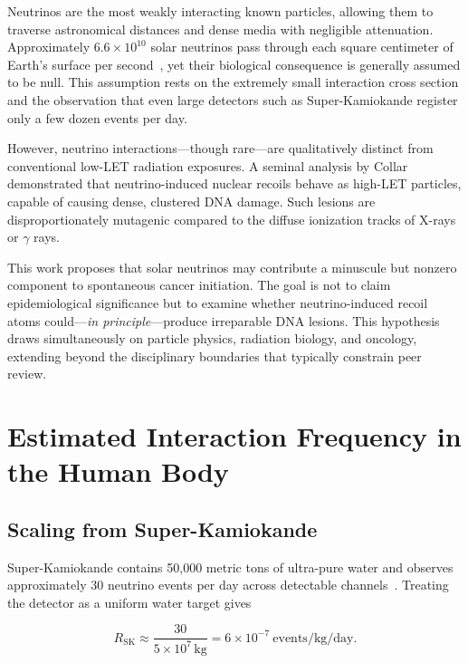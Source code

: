 \documentclass[12pt,a4paper]{article}
\begin{document}
Neutrinos are the most weakly interacting known particles, allowing them to traverse astronomical distances and dense media with negligible attenuation. Approximately $6.6\times10^{10}$ solar neutrinos pass through each square centimeter of Earth's surface per second~\cite{superk_physics}, yet their biological consequence is generally assumed to be null. This assumption rests on the extremely small interaction cross section and the observation that even large detectors such as Super-Kamiokande register only a few dozen events per day.

However, neutrino interactions---though rare---are qualitatively distinct from conventional low-LET radiation exposures. A seminal analysis by Collar~\cite{collar1996} demonstrated that neutrino-induced nuclear recoils behave as high-LET particles, capable of causing dense, clustered DNA damage. Such lesions are disproportionately mutagenic compared to the diffuse ionization tracks of X-rays or $\gamma$ rays.

This work proposes that solar neutrinos may contribute a minuscule but nonzero component to spontaneous cancer initiation. The goal is not to claim epidemiological significance but to examine whether neutrino-induced recoil atoms could---\textit{in principle}---produce irreparable DNA lesions. This hypothesis draws simultaneously on particle physics, radiation biology, and oncology, extending beyond the disciplinary boundaries that typically constrain peer review.

\section{Estimated Interaction Frequency in the Human Body}

\subsection{Scaling from Super-Kamiokande}

Super-Kamiokande contains 50,000 metric tons of ultra-pure water and observes approximately 30 neutrino events per day across detectable channels~\cite{superk_solar2024}. Treating the detector as a uniform water target gives

\begin{equation}
R_{\mathrm{SK}} \approx 
\frac{30}{5\times10^{7}\, \mathrm{kg}}
= 6\times10^{-7}\ \mathrm{events/kg/day}.
\label{eq:rate_sk}
\end{equation}
\end{document}
